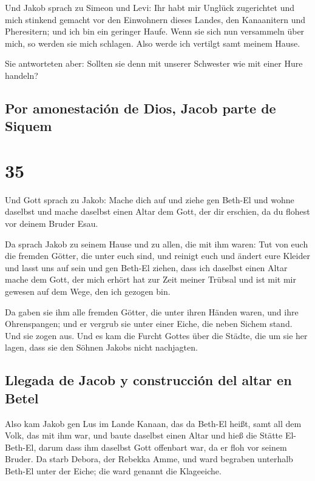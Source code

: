  Und Jakob sprach zu Simeon und Levi: Ihr habt mir
Unglück zugerichtet und mich stinkend gemacht vor den Einwohnern dieses
Landes, den Kanaanitern und Pheresitern; und ich bin ein geringer Haufe.
Wenn sie sich nun versammeln über mich, so werden sie mich schlagen.
Also werde ich vertilgt samt meinem Hause.

 Sie antworteten aber: Sollten sie denn mit unserer
Schwester wie mit einer Hure handeln?

\hypertarget{por-amonestaciuxf3n-de-dios-jacob-parte-de-siquem}{%
\subsection{Por amonestación de Dios, Jacob parte de
Siquem}\label{por-amonestaciuxf3n-de-dios-jacob-parte-de-siquem}}

\hypertarget{section-34}{%
\section{35}\label{section-34}}

 Und Gott sprach zu Jakob: Mache dich auf und ziehe gen
Beth-El und wohne daselbst und mache daselbst einen Altar dem Gott, der
dir erschien, da du flohest vor deinem Bruder Esau.

 Da sprach Jakob zu seinem Hause und zu allen, die mit ihm
waren: Tut von euch die fremden Götter, die unter euch sind, und reinigt
euch und ändert eure Kleider  und lasst uns auf sein und
gen Beth-El ziehen, dass ich daselbst einen Altar mache dem Gott, der
mich erhört hat zur Zeit meiner Trübsal und ist mit mir gewesen auf dem
Wege, den ich gezogen bin.

 Da gaben sie ihm alle fremden Götter, die unter ihren
Händen waren, und ihre Ohrenspangen; und er vergrub sie unter einer
Eiche, die neben Sichem stand.  Und sie zogen aus. Und es
kam die Furcht Gottes über die Städte, die um sie her lagen, dass sie
den Söhnen Jakobs nicht nachjagten.

\hypertarget{llegada-de-jacob-y-construcciuxf3n-del-altar-en-betel}{%
\subsection{Llegada de Jacob y construcción del altar en
Betel}\label{llegada-de-jacob-y-construcciuxf3n-del-altar-en-betel}}

 Also kam Jakob gen Lus im Lande Kanaan, das da Beth-El
heißt, samt all dem Volk, das mit ihm war,  und baute
daselbst einen Altar und hieß die Stätte El-Beth-El, darum dass ihm
daselbst Gott offenbart war, da er floh vor seinem Bruder.
 Da starb Debora, der Rebekka Amme, und ward begraben
unterhalb Beth-El unter der Eiche; die ward genannt die Klageeiche.

